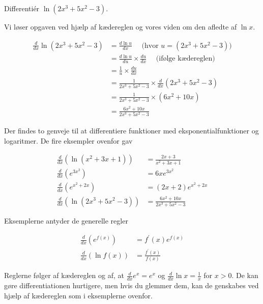 \begin{example}

Differentiér \(\ln \left(2 x^3+5 x^2-3\right)\).
\end{example}
\begin{solution}
Vi løser opgaven ved hjælp af kædereglen og vores viden om den afledte af \(\ln x\).

\[
\begin{aligned}
\frac{d}{d x} \ln \left(2 x^3+5 x^2-3\right) & =\frac{d \ln u}{d x} \quad \text { (hvor } u=\left(2 x^3+5 x^2-3\right)\text{)} \\
& =\frac{d \ln u}{d u} \times \frac{d u}{d x} \quad \text { (ifølge kædereglen) } \\
& =\frac{1}{u} \times \frac{d u}{d x} \\
& =\frac{1}{2 x^3+5 x^2-3} \times \frac{d}{d x}\left(2 x^3+5 x^2-3\right) \\
& =\frac{1}{2 x^3+5 x^2-3} \times\left(6 x^2+10 x\right) \\
& =\frac{6 x^2+10 x}{2 x^3+5 x^2-3}
\end{aligned}
\]
\end{solution}

Der findes to genveje til at differentiere funktioner med eksponentialfunktioner og logaritmer. De fire eksempler ovenfor gav

\[
\begin{aligned}
\frac{d}{d x}\left(\ln\left(x^2+3 x+1\right)\right) & =\frac{2 x+3}{x^2+3 x+1} \\
\frac{d}{d x}\left(e^{3 x^2}\right) & =6 x e^{3 x^2} \\
\frac{d}{d x}\left(e^{x^2+2 x}\right) & =\left(2x+2\right)e^{x^2+2 x} \\
\frac{d}{d x}\left(\ln\left(2 x^3+5 x^2-3\right)\right) & =\frac{6 x^2+10 x}{2 x^3+5 x^2-3}
\end{aligned}
\]


Eksemplerne antyder de generelle regler

\[
\begin{aligned}
\frac{d}{d x}\left(e^{f(x)}\right) & =f^{\prime}(x) e^{f(x)} \\
\frac{d}{d x}(\ln f(x)) & =\frac{f^{\prime}(x)}{f(x)}
\end{aligned}
\]


Reglerne følger af kædereglen og af, at \(\frac{d}{dx}e^x=e^x\) og \(\frac{d}{dx}\ln x=\frac{1}{x}\) for $x>0$. De kan gøre differentiationen hurtigere, men hvis du glemmer dem, kan de genskabes ved hjælp af kædereglen som i eksemplerne ovenfor.


